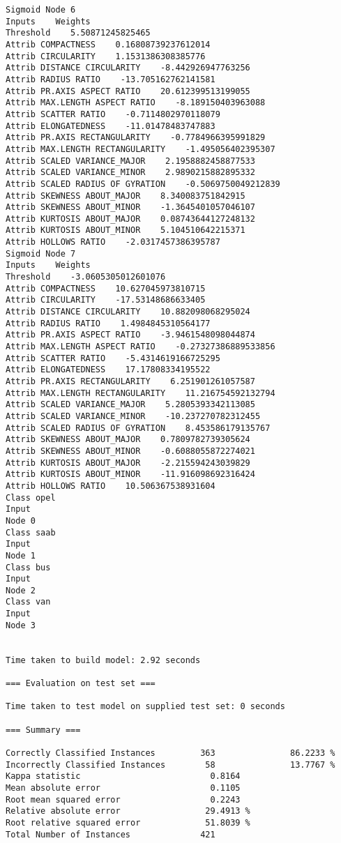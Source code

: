 \documentclass[
	article,			%
	11pt,				%
	oneside,			%
	a4paper,			%
	english,			%
	brazil,				%
	sumario=tradicional
	]{abntex2}
\begin{document}
\begin{lstlisting}
Sigmoid Node 6
Inputs    Weights
Threshold    5.50871245825465
Attrib COMPACTNESS    0.16808739237612014
Attrib CIRCULARITY    1.1531386308385776
Attrib DISTANCE CIRCULARITY    -8.442926947763256
Attrib RADIUS RATIO    -13.705162762141581
Attrib PR.AXIS ASPECT RATIO    20.612399513199055
Attrib MAX.LENGTH ASPECT RATIO    -8.189150403963088
Attrib SCATTER RATIO    -0.7114802970118079
Attrib ELONGATEDNESS    -11.01478483747883
Attrib PR.AXIS RECTANGULARITY    -0.7784966395991829
Attrib MAX.LENGTH RECTANGULARITY    -1.495056402395307
Attrib SCALED VARIANCE_MAJOR    2.1958882458877533
Attrib SCALED VARIANCE_MINOR    2.9890215882895332
Attrib SCALED RADIUS OF GYRATION    -0.5069750049212839
Attrib SKEWNESS ABOUT_MAJOR    8.340083751842915
Attrib SKEWNESS ABOUT_MINOR    -1.3645401057046107
Attrib KURTOSIS ABOUT_MAJOR    0.08743644127248132
Attrib KURTOSIS ABOUT_MINOR    5.104510642215371
Attrib HOLLOWS RATIO    -2.0317457386395787
Sigmoid Node 7
Inputs    Weights
Threshold    -3.0605305012601076
Attrib COMPACTNESS    10.627045973810715
Attrib CIRCULARITY    -17.53148686633405
Attrib DISTANCE CIRCULARITY    10.882098068295024
Attrib RADIUS RATIO    1.4984845310564177
Attrib PR.AXIS ASPECT RATIO    -3.9461548098044874
Attrib MAX.LENGTH ASPECT RATIO    -0.27327386889533856
Attrib SCATTER RATIO    -5.4314619166725295
Attrib ELONGATEDNESS    17.17808334195522
Attrib PR.AXIS RECTANGULARITY    6.251901261057587
Attrib MAX.LENGTH RECTANGULARITY    11.216754592132794
Attrib SCALED VARIANCE_MAJOR    5.2805393342113085
Attrib SCALED VARIANCE_MINOR    -10.237270782312455
Attrib SCALED RADIUS OF GYRATION    8.453586179135767
Attrib SKEWNESS ABOUT_MAJOR    0.7809782739305624
Attrib SKEWNESS ABOUT_MINOR    -0.6088055872274021
Attrib KURTOSIS ABOUT_MAJOR    -2.215594243039829
Attrib KURTOSIS ABOUT_MINOR    -11.916098692316424
Attrib HOLLOWS RATIO    10.506367538931604
Class opel
Input
Node 0
Class saab
Input
Node 1
Class bus
Input
Node 2
Class van
Input
Node 3


Time taken to build model: 2.92 seconds

=== Evaluation on test set ===

Time taken to test model on supplied test set: 0 seconds

=== Summary ===

Correctly Classified Instances         363               86.2233 %
Incorrectly Classified Instances        58               13.7767 %
Kappa statistic                          0.8164
Mean absolute error                      0.1105
Root mean squared error                  0.2243
Relative absolute error                 29.4913 %
Root relative squared error             51.8039 %
Total Number of Instances              421     


\end{lstlisting}
\end{document}
